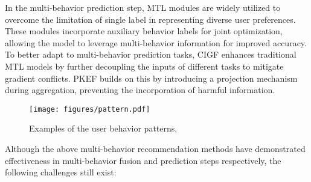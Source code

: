 In the multi-behavior prediction step, MTL modules are widely utilized \cite{mbgmn, CML, crgcn, bipn} to overcome the limitation of single label \cite{mbgcn, smbrec} in representing diverse user preferences. These modules incorporate auxiliary behavior labels for joint optimization, allowing the model to leverage multi-behavior information for improved accuracy. To better adapt to multi-behavior prediction tasks, CIGF \cite{cigf} enhances traditional MTL models \cite{mmoe, PLE} by further decoupling the inputs of different tasks to mitigate gradient conflicts. PKEF \cite{pkef} builds on this by introducing a projection mechanism during aggregation, preventing the incorporation of harmful information.


\begin{figure}[t]
	\centering
	\setlength{\belowcaptionskip}{0cm}
	\setlength{\abovecaptionskip}{0cm}
	\texttt{[image: figures/pattern.pdf]}
	\caption{Examples of the user behavior patterns.}
	\label{fig:behavior_pattern}
	\vspace{-4mm}
\end{figure}

Although the above multi-behavior recommendation methods have demonstrated effectiveness in multi-behavior fusion and prediction steps respectively, the following challenges still exist:

